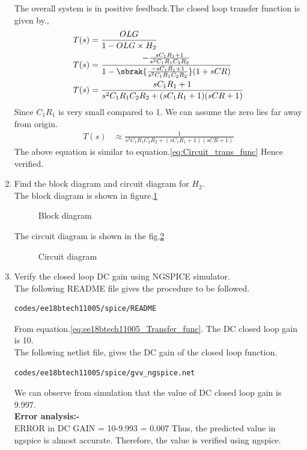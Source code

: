 \begin{enumerate}[label=\arabic*.,ref=\theenumi]
\solution The overall system is in positive feedback.The closed loop transfer function is given by.,
\begin{align}
    T(s) &= \frac{OLG}{1-OLG\times H_2}\\
    T(s) &= \frac{-\frac{sC_1R_1+1}{s^2C_1R_1C_2R_2}}{1-\sbrak{\frac{-sC_1R_1+1}{s^2C_1R_1C_2R_2}}(1+sCR)}\\
    T(s) &= \frac{sC_1R_1+1}{s^2C_1R_1C_2R_2+(sC_1R_1+1)(sCR+1)}
\end{align}
Since $C_1R_1$ is very small compared to 1. We can assume the zero lies far away from origin.
\begin{align}
    T(s) &\approx  \frac{1}{s^2C_1R_1C_2R_2+(sC_1R_1+1)(sCR+1)}
\end{align}
The above equation is similar to equation.\ref{eq:Circuit_trans_func}
Hence verified.

\item Find the block diagram and circuit diagram for $H_2$.\\
\solution The block diagram is shown in figure.\ref{fig:H_blockdiagram}
\begin{figure}[!hbt]
	\begin{center}
			\resizebox{\columnwidth}{!}{}
	\end{center}
\caption{Block diagram}
\label{fig:H_blockdiagram}
\end{figure}
The circuit diagram is shown in the fig.\ref{fig:H_circuit}
\begin{figure}[!hbt]
	\begin{center}
			\resizebox{\columnwidth}{!}{}
	\end{center}
\caption{Circuit diagram}
\label{fig:H_circuit}
\end{figure}
\item Verify the closed loop DC gain using NGSPICE simulator.
\\
\solution 
The following README file gives the procedure to be followed.
\begin{lstlisting}
codes/ee18btech11005/spice/README
\end{lstlisting}
From equation.\ref{eq:ee18btech11005_Transfer_func}.
The DC closed loop gain is 10.\\
The following netlist file, gives the DC gain of the closed loop function.
\begin{lstlisting}
codes/ee18btech11005/spice/gvv_ngspice.net
\end{lstlisting}
We can observe from simulation that the value of DC closed loop gain is 9.997.\\
\textbf{Error analysis:-}\\
ERROR in DC GAIN = 10-9.993 = 0.007
Thus, the predicted value in ngspice is almost accurate.
Therefore, the value is verified using ngspice.


\end{enumerate}
